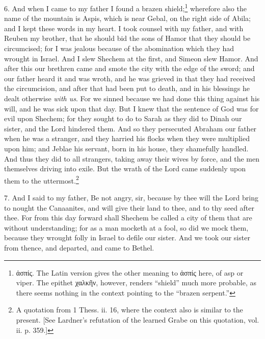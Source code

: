 6. And when I came to my father I found a brazen shield;\footnote{\textgreek{ἀσπίς}. The Latin version gives the other meaning to \textgreek{ἀσπίς} here, of asp or viper. The epithet \textgreek{χαλκῆν}, however, renders “shield” much more probable, as there seems nothing in the context pointing to the “brazen serpent.”} wherefore also the name of the mountain is Aspis, which is near Gebal, on the right side of Abila; and I kept these words in my heart. I took counsel with my father, and with Reuben my brother, that he should bid the sons of Hamor that they should be circumcised; for I was jealous because of the abomination which they had wrought in Israel. And I slew Shechem at the first, and Simeon slew Hamor. And after this our brethren came and smote the city with the edge of the sword; and our father heard it and was wroth, and he was grieved in that they had received the circumcision, and after that had been put to death, and in his blessings he dealt otherwise \emph{with us}. For we sinned because we had done this thing against his will, and he was sick upon that day. But I knew that the sentence of God was for evil upon Shechem; for they sought to do to Sarah as they did to Dinah our sister, and the Lord hindered them. And so they persecuted Abraham our father when he was a stranger, and they harried his flocks when they were multiplied upon him; and Jeblae his servant, born in his house, they shamefully handled. And thus they did to all strangers, taking away their wives by force, and the men themselves driving into exile. But the wrath of the Lord came suddenly upon them to the uttermost.\footnote{A quotation from 1 Thess. ii. 16, where the context also is similar to the present. [See Lardner’s refutation of the learned Grabe on this quotation, vol. ii. p. 359.]}

7. And I said to my father, Be not angry, sir, because by thee will the Lord bring to nought the Canaanites, and will give their land to thee, and to thy seed after thee. For from this day forward shall Shechem be called a city of them that are without understanding; for as a man mocketh at a fool, so did we mock them, because they wrought folly in Israel to defile our sister. And we took our sister from thence, and departed, and came to Bethel.

